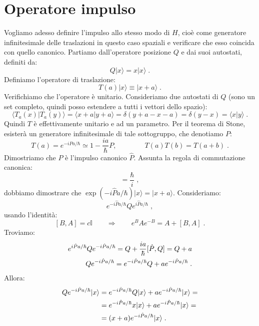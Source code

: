\documentclass[12pt,a4paper]{report}
\theoremstyle{definition}
\numberwithin{equation}{section}
\newcommand{\bra}{\langle}
\newcommand{\ket}{\rangle}
\begin{document}
\section{Operatore impulso}
Vogliamo adesso definire l'impulso allo stesso modo di $H$, cioè come generatore infinitesimale delle traslazioni in questo caso spaziali e verificare che esso coincida con quello canonico. Partiamo dall'operatore posizione $Q$ e dai suoi autostati, definiti da:
\begin{equation}
Q|x\ket=x|x\ket\;.
\end{equation}
Definiamo l'operatore di traslazione:
\begin{equation}
T(a)|x\ket\equiv|x+a\ket\;.
\end{equation}
Verifichiamo che l'operatore è unitario. Consideriamo due autostati di $Q$ (sono un set completo, quindi posso estendere a tutti i vettori dello spazio):
\begin{equation}
\bra T_a(x)|T_a(y)\ket=\bra x+a|y+a\ket=\delta(y+a-x-a)=\delta(y-x)=\bra x|y\ket\;.
\end{equation}
Quindi $T$ è effettivamente unitario e ad un parametro. Per il teorema di Stone, esisterà un generatore infinitesimale di tale sottogruppo, che denotiamo $P$:
\begin{equation}
T(a)=e^{-iPa/\hbar}\simeq 1-\frac{ia}{\hbar}P, \qquad\qquad T(a)T(b)=T(a+b)\;.
\end{equation}
Dimostriamo che $P$ è l'impulso canonico $\hat{P}$. Assunta la regola di commutazione canonica:
\begin{equation}
[\hat{P},\hat{Q}]=\frac{\hbar}{i}\;,
\end{equation}
dobbiamo dimostrare che $\exp(-i\hat{P}a/\hbar)|x\ket=|x+a\ket$. Consideriamo:
\begin{equation}
e^{-i\hat{P}a/\hbar}Qe^{i\hat{P}a/\hbar}\;,
\end{equation}
usando l'identità:
$$
[B,A]=c\mathbb{I} \qquad \Longrightarrow\qquad e^BAe^{-B}=A+[B,A]\;.
$$	
Troviamo:
\begin{align}
e^{i\hat{P}a/\hbar}Qe^{-i\hat{P}a/\hbar}=Q+\frac{ia}{\hbar}[\hat{P},Q]=Q+a \notag \\
Qe^{-i\hat{P}a/\hbar}=e^{-i\hat{P}a/\hbar}Q+ae^{-i\hat{P}a/\hbar}\;.
\end{align}
Allora:
\begin{align}
Qe^{-i\hat{P}a/\hbar}|x\ket &= e^{-i\hat{P}a/\hbar}Q|x\ket+ae^{-i\hat{P}a/\hbar}|x\ket = \notag \\
&= e^{-i\hat{P}a/\hbar}x|x\ket+ae^{-i\hat{P}a/\hbar}|x\ket= \notag \\
&= (x+a)e^{-i\hat{P}a/\hbar}|x\ket\;.
\end{align}
\end{document}
